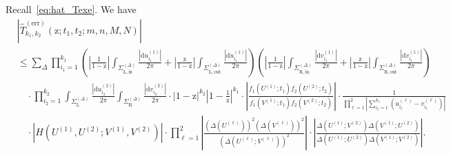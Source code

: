 \documentclass{article}
\numberwithin{equation}{section}
\newcommand{\exe}{\mathrm{err}}
\newcommand{\inn}{\mathrm{in}}
\newcommand{\LL}{\mathrm{L}}
\newcommand{\out}{\mathrm{out}}
\newcommand{\RR}{\mathrm{R}}
\begin{document}
Recall~\eqref{eq:hat_Texe}. We have
\begin{equation}
	\label{eq:aux_23}
	\begin{split}
		&\left|\hat T_{k_1,k_2}^{(\exe)}(\mathrm{z};t_1,t_2;m,n,M,N)\right|\\
		&\le 
		\sum_{\Delta}
		\prod_{i_1=1}^{k_1}     
		\left(  \left|\frac{1}{1-\mathrm{z}}\right| \int_{\Sigma_{\LL,\inn}^{(\Delta)}} 	    
		\frac{|\mathrm{d}u^{(1)}_{i_1}|}{2\pi}   
		+\left|\frac{\mathrm{z}}{1-\mathrm{z}}\right| \int_{\Sigma_{\LL,\out}^{(\Delta)}} \frac{|\mathrm{d}u^{(1)}_{i_1}|}{2\pi}   
		\right)
		\left(  \left|\frac{1}{1-\mathrm{z}}\right| \int_{\Sigma_{\RR,\inn}^{(\Delta)}} 	    
		\frac{|\mathrm{d}v^{(1)}_{i_1}|}{2\pi}   
		+\left|\frac{\mathrm{z}}{1-\mathrm{z}}\right| \int_{\Sigma_{\RR,\out}^{(\Delta)}} \frac{|\mathrm{d}v^{(1)}_{i_1}|}{2\pi}   
		\right)
		\\
		&\quad \cdot 
		\prod_{i_2=1}^{k_2}  
		\int_{\Sigma_\LL^{(\Delta)}} \frac{|\mathrm{d}u^{(2)}_{i_2}|}{2\pi}   
		\int_{\Sigma_\RR^{(\Delta)}} \frac{|\mathrm{d}v^{(2)}_{i_2}|}{2\pi}  
		\cdot    
		\left|1-\mathrm{z}\right|^{k_2}
		\left|1-\frac{1}{\mathrm{z}}\right|^{k_1}
		\cdot 
		\left|\frac{f_1(U^{(1)};t_1)f_2(U^{(2)};t_2)}{f_1(V^{(1)};t_1)f_2(V^{(2)};t_2)}\right|
		\cdot \frac{1}{\prod_{\ell=1}^2\left|\sum_{i_\ell=1}^{k_\ell}(u_{i_\ell}^{(\ell)} -v_{i_\ell}^{(\ell)})\right|}
		\\
		&\quad \cdot \left| H(U^{(1)},U^{(2)};V^{(1)},V^{(2)})\right|\cdot 
		\prod_{\ell=1}^2
		\left|\frac{\left( \Delta(U^{(\ell)}) \right)^2
			\left( \Delta(V^{(\ell)}) \right)^2
		}
		{\left( \Delta(U^{(\ell)}; V^{(\ell)}) \right)^2}\right|
		\cdot 
		\left|\frac{\Delta(U^{(1)};V^{(2)})\Delta(V^{(1)};U^{(2)})}
		{\Delta(U^{(1)};U^{(2)})\Delta(V^{(1)};V^{(2)})}\right|.
	\end{split}
\end{equation}
\end{document}
